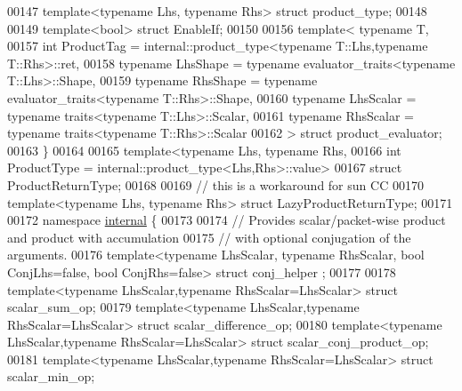 \begin{DoxyCode}
00147 \textcolor{keyword}{template}<\textcolor{keyword}{typename} Lhs, \textcolor{keyword}{typename} Rhs> \textcolor{keyword}{struct }product\_type;
00148 
00149 \textcolor{keyword}{template}<\textcolor{keywordtype}{bool}> \textcolor{keyword}{struct }EnableIf;
00150 
00156 \textcolor{keyword}{template}< \textcolor{keyword}{typename} T,
00157           \textcolor{keywordtype}{int} ProductTag = internal::product\_type<typename T::Lhs,typename T::Rhs>::ret,
00158           \textcolor{keyword}{typename} LhsShape = \textcolor{keyword}{typename} evaluator\_traits<typename T::Lhs>::Shape,
00159           \textcolor{keyword}{typename} RhsShape = \textcolor{keyword}{typename} evaluator\_traits<typename T::Rhs>::Shape,
00160           \textcolor{keyword}{typename} LhsScalar = \textcolor{keyword}{typename} traits<typename T::Lhs>::Scalar,
00161           \textcolor{keyword}{typename} RhsScalar = \textcolor{keyword}{typename} traits<typename T::Rhs>::Scalar
00162         > \textcolor{keyword}{struct }product\_evaluator;
00163 \}
00164 
00165 \textcolor{keyword}{template}<\textcolor{keyword}{typename} Lhs, \textcolor{keyword}{typename} Rhs,
00166          \textcolor{keywordtype}{int} ProductType = internal::product\_type<Lhs,Rhs>::value>
00167 \textcolor{keyword}{struct }ProductReturnType;
00168 
00169 \textcolor{comment}{// this is a workaround for sun CC}
00170 \textcolor{keyword}{template}<\textcolor{keyword}{typename} Lhs, \textcolor{keyword}{typename} Rhs> \textcolor{keyword}{struct }LazyProductReturnType;
00171 
00172 \textcolor{keyword}{namespace }\hyperlink{namespaceinternal}{internal} \{
00173 
00174 \textcolor{comment}{// Provides scalar/packet-wise product and product with accumulation}
00175 \textcolor{comment}{// with optional conjugation of the arguments.}
00176 \textcolor{keyword}{template}<\textcolor{keyword}{typename} LhsScalar, \textcolor{keyword}{typename} RhsScalar, \textcolor{keywordtype}{bool} ConjLhs=false, \textcolor{keywordtype}{bool} ConjRhs=false> \textcolor{keyword}{struct }conj\_helper
      ;
00177 
00178 \textcolor{keyword}{template}<\textcolor{keyword}{typename} LhsScalar,\textcolor{keyword}{typename} RhsScalar=LhsScalar> \textcolor{keyword}{struct }scalar\_sum\_op;
00179 \textcolor{keyword}{template}<\textcolor{keyword}{typename} LhsScalar,\textcolor{keyword}{typename} RhsScalar=LhsScalar> \textcolor{keyword}{struct }scalar\_difference\_op;
00180 \textcolor{keyword}{template}<\textcolor{keyword}{typename} LhsScalar,\textcolor{keyword}{typename} RhsScalar=LhsScalar> \textcolor{keyword}{struct }scalar\_conj\_product\_op;
00181 \textcolor{keyword}{template}<\textcolor{keyword}{typename} LhsScalar,\textcolor{keyword}{typename} RhsScalar=LhsScalar> \textcolor{keyword}{struct }scalar\_min\_op;

\end{DoxyCode}
